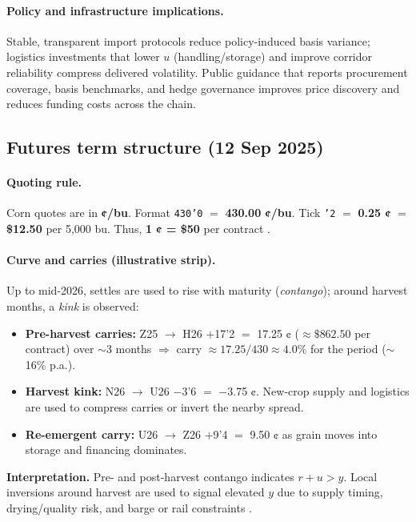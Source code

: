 \documentclass[11pt,a4paper]{article} %
\begin{document}
\paragraph{Policy and infrastructure implications.}
Stable, transparent import protocols reduce policy-induced basis variance; logistics investments that lower \(u\) (handling/storage) and improve corridor reliability compress delivered volatility. Public guidance that reports procurement coverage, basis benchmarks, and hedge governance improves price discovery and reduces funding costs across the chain.


\subsection{Futures term structure (12 Sep 2025)}
\paragraph{Quoting rule.} Corn quotes are in \textbf{¢/bu}. Format \texttt{430'0} \(=\) \textbf{430.00 ¢/bu}. Tick \texttt{'2} \(=\) \textbf{0.25 ¢} \(=\) \textbf{\$12.50} per 5,000 bu. Thus, \textbf{1 ¢ = \$50} per contract \citep{barchart_zc_specs}.

\paragraph{Curve and carries (illustrative strip).}
Up to mid-2026, settles are used to rise with maturity (\emph{contango}); around harvest months, a \emph{kink} is observed:
\begin{itemize}
  \item \textbf{Pre-harvest carries:} Z25 \(\to\) H26 \(+\)17'2 \(=\) 17.25 ¢ (\(\approx\$862.50\) per contract) over \(\sim\)3 months \(\Rightarrow\) carry \(\approx 17.25/430\approx 4.0\%\) for the period (\(\sim\)16\% p.a.).
  \item \textbf{Harvest kink:} N26 \(\to\) U26 \(-\)3'6 \(=\) \(-\)3.75 ¢. New-crop supply and logistics are used to compress carries or invert the nearby spread.
  \item \textbf{Re-emergent carry:} U26 \(\to\) Z26 \(+\)9'4 \(=\) 9.50 ¢ as grain moves into storage and financing dominates.
\end{itemize}
\textbf{Interpretation.} Pre- and post-harvest contango indicates \(r+u>y\). Local inversions around harvest are used to signal elevated \(y\) due to supply timing, drying/quality risk, and barge or rail constraints \citep{ams_gtr_2023,ncga_storage_2025}.
\end{document}
